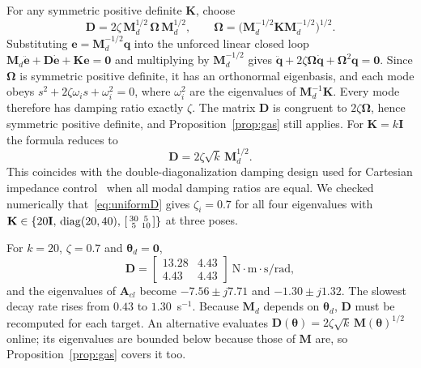 \documentclass[letterpaper, 10pt, conference]{ieeeconf}
\begin{document}
For any symmetric positive definite $\mathbf{K}$, choose
\begin{equation}
\mathbf{D}=2\zeta\,\mathbf{M}_d^{1/2}\,\boldsymbol{\Omega}\,
\mathbf{M}_d^{1/2},
\qquad
\boldsymbol{\Omega}=\big(\mathbf{M}_d^{-1/2}\mathbf{K}
\mathbf{M}_d^{-1/2}\big)^{1/2}.
\label{eq:uniformD}
\end{equation}
Substituting $\mathbf{e}=\mathbf{M}_d^{-1/2}\mathbf{q}$ into the
unforced linear closed loop
$\mathbf{M}_d\ddot{\mathbf{e}}+\mathbf{D}\dot{\mathbf{e}}+\mathbf{K}\mathbf{e}=\mathbf{0}$
and multiplying by $\mathbf{M}_d^{-1/2}$ gives
$\ddot{\mathbf{q}}+2\zeta\boldsymbol{\Omega}\dot{\mathbf{q}}
+\boldsymbol{\Omega}^2\mathbf{q}=\mathbf{0}$. Since
$\boldsymbol{\Omega}$ is symmetric positive definite, it has an
orthonormal eigenbasis, and each mode obeys
$s^2+2\zeta\omega_i s+\omega_i^2=0$, where $\omega_i^2$ are the
eigenvalues of $\mathbf{M}_d^{-1}\mathbf{K}$. Every mode therefore
has damping ratio exactly $\zeta$. The matrix $\mathbf{D}$ is
congruent to $2\zeta\boldsymbol{\Omega}$, hence symmetric positive
definite, and Proposition~\ref{prop:gas} still applies. For
$\mathbf{K}=k\mathbf{I}$ the formula reduces to
\begin{equation}
\mathbf{D}=2\zeta\sqrt{k}\,\mathbf{M}_d^{1/2}.
\label{eq:uniformDk}
\end{equation}
This coincides with the double-diagonalization damping design
used for Cartesian impedance control~\cite{albuschaeffer2003}
when all modal damping ratios are equal. We checked numerically
that~\eqref{eq:uniformD} gives $\zeta_i=0.7$ for all four
eigenvalues with $\mathbf{K}\in\{20\mathbf{I},\,
\mathrm{diag}(20,40),\,\begin{bsmallmatrix}30&5\\5&10\end{bsmallmatrix}\}$
at three poses.

For $k=20$, $\zeta=0.7$ and $\boldsymbol{\theta}_d=\mathbf{0}$,
\[
\mathbf{D}=\begin{bmatrix}13.28&4.43\\4.43&4.43\end{bmatrix}
\ \mathrm{N\cdot m\cdot s/rad},
\]
and the eigenvalues of $\mathbf{A}_{cl}$ become
$-7.56\pm j7.71$ and $-1.30\pm j1.32$. The slowest decay rate
rises from $0.43$ to $1.30$~s$^{-1}$. Because
$\mathbf{M}_d$ depends on $\boldsymbol{\theta}_d$, $\mathbf{D}$ must be
recomputed for each target. An alternative evaluates
$\mathbf{D}(\boldsymbol{\theta})=2\zeta\sqrt{k}\,\mathbf{M}(\boldsymbol{\theta})^{1/2}$
online; its eigenvalues are bounded below because those of
$\mathbf{M}$ are, so Proposition~\ref{prop:gas} covers it too.
\end{document}

